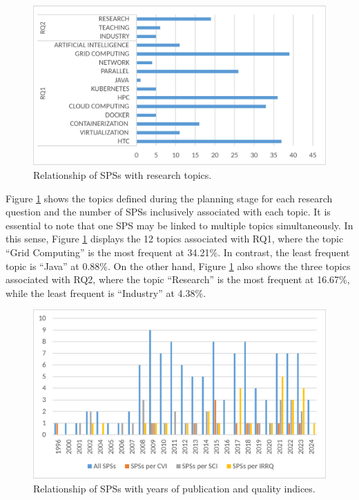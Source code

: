 \begin{figure}[htbp]
	\centering
	\includegraphics[scale=0.3]{resources/figures/Imagen3.eps}
	\caption{Relationship of SPSs with research topics.}
	\label{fig:SPSsByTopics}
\end{figure}

Figure \ref{fig:SPSsByTopics} shows the topics defined during the planning stage for each research question and the number of SPSs inclusively associated with each topic. It is essential to note that one SPS may be linked to multiple topics simultaneously. In this sense, Figure \ref{fig:SPSsByTopics} displays the 12 topics associated with RQ1, where the topic ``Grid Computing'' is the most frequent at 34.21\%. In contrast, the least frequent topic is ``Java'' at 0.88\%. On the other hand, Figure \ref{fig:SPSsByTopics} also shows the three topics associated with RQ2, where the topic ``Research'' is the most frequent at 16.67\%, while the least frequent is ``Industry'' at 4.38\%.

\begin{figure}[htbp]
	\centering
	\includegraphics[scale=0.3]{resources/figures/Imagen4.eps}
	\caption{Relationship of SPSs with years of publication and quality indices.}
	\label{fig:SPSsByYearsAndIndexes}
\end{figure}

